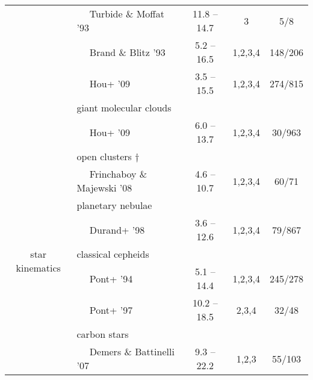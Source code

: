 \documentclass[twocolumn,prd,reprint,preprintnumbers,amsmath,amssymb,superscriptaddress,nofootinbib]{revtex4}
\begin{document}
\begin{table*}[htp]
\begin{center}
\begin{tabular}{|c|l c  c c|}
					& $\quad$ Turbide \& Moffat '93 \cite{TurbideMoffat1993}   				& 11.8 -- 14.7 					& 3		& \hspace{0.32cm}5/8\hspace{0.32cm} 			\\
					& $\quad$ Brand \& Blitz '93 \cite{BrandBlitz1993} 					& \hspace{0.16cm}5.2 -- 16.5 			& 1,2,3,4	& 148/206			 			\\
					& $\quad$ Hou+ '09 \cite{Hou2009}  							& \hspace{0.16cm}3.5 -- 15.5 			& 1,2,3,4	& 274/815						\\
					& giant molecular clouds								&						&		&					\\
					& $\quad$ Hou+ '09 \cite{Hou2009}							& \hspace{0.16cm}6.0 -- 13.7 			& 1,2,3,4	& \hspace{0.16cm}30/963  					\\
\hline
\multirow{10}{*}{star kinematics}	& open clusters $\dagger$										&						&		&					\\
					& $\quad$ Frinchaboy \& Majewski '08 \cite{FrinchaboyMajewski2008}  			& \hspace{0.16cm}4.6 -- 10.7 			& 1,2,3,4	& \hspace{0.16cm}60/71\hspace{0.16cm} 	\\
					& planetary nebulae									&						& 		&					\\
					& $\quad$ Durand+ '98 \cite{Durand1998} 						& \hspace{0.16cm}3.6 -- 12.6 			& 1,2,3,4	& \hspace{0.16cm}79/867 			\\
					& classical cepheids									&						&		&					\\
					& $\quad$ Pont+ '94 \cite{Pont1994} 							& \hspace{0.16cm}5.1 -- 14.4 			& 1,2,3,4	& 245/278						\\
					& $\quad$ Pont+ '97 \cite{Pont1997} 							& 10.2 -- 18.5 					& 2,3,4		& \hspace{0.16cm}32/48\hspace{0.16cm} 					\\
					& carbon stars										&						&		&					\\
					& $\quad$ Demers \& Battinelli '07 \cite{DemersBattinelli2007} 				& \hspace{0.16cm}9.3 -- 22.2 			& 1,2,3		& \hspace{0.16cm}55/103 				\\

\end{tabular}
\end{center}
\end{table*}
\end{document}
